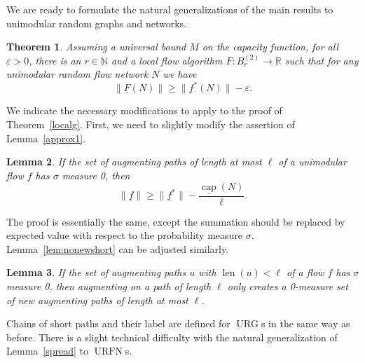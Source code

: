 \documentclass[12pt,a4paper]{article}
\newtheorem{Theorem}{Theorem}
\newtheorem{Lemma}[Theorem]{Lemma}
\newcommand{\len}{\operatorname{len}}
\newcommand{\capp}{\operatorname{cap}}
\newcommand{\eps}{\varepsilon}
\newcommand{\N}{\mathbb{N}}
\renewcommand{\:}{\colon}
\DeclareMathOperator{\URG}{URG}
\DeclareMathOperator{\URN}{URFN}
\begin{document}
We are ready to formulate the natural generalizations of the main results to unimodular random graphs and networks. 

\begin{Theorem}\label{localgflowuni}
Assuming a universal bound $M$ on the capacity function, for all $\eps > 0$, there is an $r\in \N$ and a local flow algorithm $F\: B_r^{(2)} \rightarrow \mathbb{R}$ such that for any unimodular random flow network $N$ we have
\begin{equation} \label{Thm1eqbounded}
\big\|\underline{F}(N)\big\| \ge \big\|\underline{f}^*(N)\big\| - \eps.
\end{equation}
\end{Theorem}

We indicate the necessary modifications to apply to the proof of Theorem~\ref{localg}. 
First, we need to slightly modify the assertion of Lemma~\ref{approx1}. 

\begin{Lemma} \label{approx1uni}
If the set of augmenting paths of length at most $\ell$ of a unimodular flow $f$ has $\sigma$ measure 0, then
\begin{equation} \label{approx1eq}
\big\|\underline{f}\big\| \ge \big\|\underline{f}^*\big\| - \frac{\underline{\capp}(N)}{\ell}.
\end{equation}
\end{Lemma}

The proof is essentially the same, except the summation should be replaced by expected value with respect to the probability measure $\sigma$. 
Lemma~\ref{lem:nonewshort} can be adjusted similarly. 

\begin{Lemma}\label{lem:nonewshortuni}
If the set of augmenting paths $u$ with $\len(u)<\ell$ of a flow $f$ has $\sigma$ measure 0, then augmenting on a path of length $\ell$ only creates a 0-measure set of new augmenting paths of length at most $\ell$.
\end{Lemma}

Chains of short paths and their label are defined for $\URG$s in the same way as before. 
There is a slight technical difficulty with the natural generalization of Lemma~\ref{spread} to $\URN$s.
\end{document}
